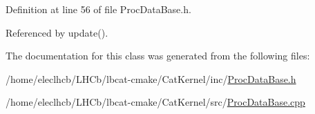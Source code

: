 Definition at line 56 of file Proc\+Data\+Base.\+h.



Referenced by update().



The documentation for this class was generated from the following files\+:\begin{DoxyCompactItemize}
\item 
/home/eleclhcb/\+L\+H\+Cb/lbcat-\/cmake/\+Cat\+Kernel/inc/\hyperlink{ProcDataBase_8h}{Proc\+Data\+Base.\+h}\item 
/home/eleclhcb/\+L\+H\+Cb/lbcat-\/cmake/\+Cat\+Kernel/src/\hyperlink{ProcDataBase_8cpp}{Proc\+Data\+Base.\+cpp}\end{DoxyCompactItemize}
